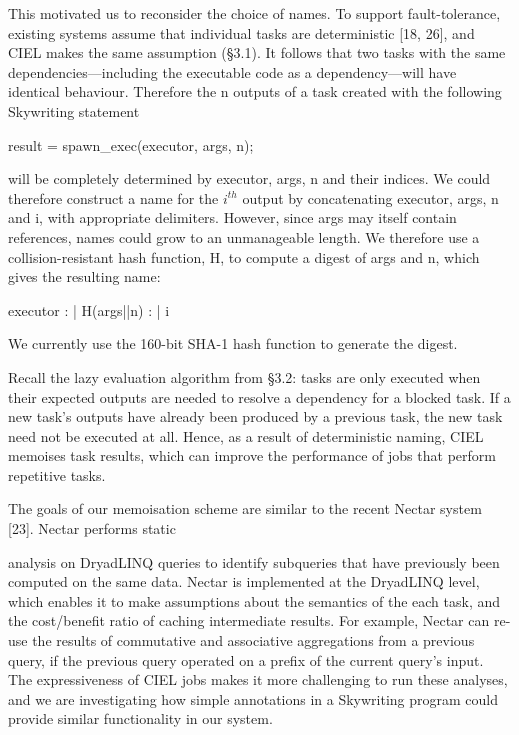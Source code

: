 \documentclass[
]{article}
\newenvironment{Shaded}{}{}
\newcommand{\NormalTok}[1]{#1}
\begin{document}
This motivated us to reconsider the choice of names. To support
fault-tolerance, existing systems assume that individual tasks are
deterministic {[}18, 26{]}, and CIEL makes the same assumption (§3.1).
It follows that two tasks with the same dependencies---including the
executable code as a dependency---will have identical behaviour.
Therefore the n outputs of a task created with the following Skywriting
statement

\begin{Shaded}
\begin{Highlighting}[]
\NormalTok{result = spawn\_exec(executor, args, n); }
\end{Highlighting}
\end{Shaded}

will be completely determined by executor, args, n and their indices. We
could therefore construct a name for the \(i^{th}\) output by
concatenating executor, args, n and i, with appropriate delimiters.
However, since args may itself contain references, names could grow to
an unmanageable length. We therefore use a collision-resistant hash
function, H, to compute a digest of args and n, which gives the
resulting name:

\begin{Shaded}
\begin{Highlighting}[]
\NormalTok{executor : | H(args||n) : | i }
\end{Highlighting}
\end{Shaded}

We currently use the 160-bit SHA-1 hash function to generate the digest.

Recall the lazy evaluation algorithm from §3.2: tasks are only executed
when their expected outputs are needed to resolve a dependency for a
blocked task. If a new task's outputs have already been produced by a
previous task, the new task need not be executed at all. Hence, as a
result of deterministic naming, CIEL memoises task results, which can
improve the performance of jobs that perform repetitive tasks.

The goals of our memoisation scheme are similar to the recent Nectar
system {[}23{]}. Nectar performs static

analysis on DryadLINQ queries to identify subqueries that have
previously been computed on the same data. Nectar is implemented at the
DryadLINQ level, which enables it to make assumptions about the
semantics of the each task, and the cost/benefit ratio of caching
intermediate results. For example, Nectar can re-use the results of
commutative and associative aggregations from a previous query, if the
previous query operated on a prefix of the current query's input. The
expressiveness of CIEL jobs makes it more challenging to run these
analyses, and we are investigating how simple annotations in a
Skywriting program could provide similar functionality in our system.
\end{document}
